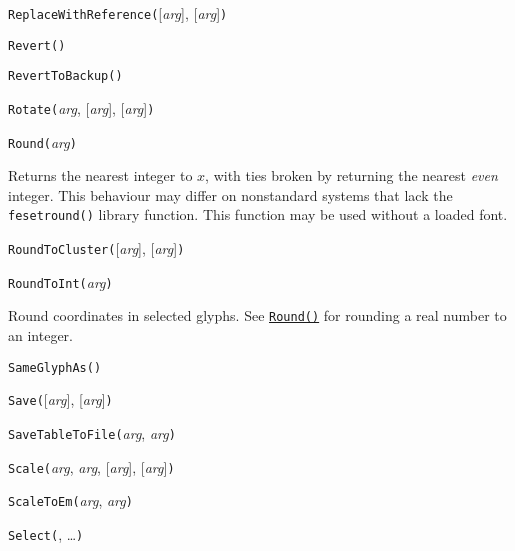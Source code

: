 
\noindent\texttt{ReplaceWithReference(}[\textit{arg}], [\textit{arg}]\texttt{)}


\noindent\texttt{Revert(}\texttt{)}


\noindent\texttt{RevertToBackup(}\texttt{)}


\noindent\texttt{Rotate(}\textit{arg}, [\textit{arg}], [\textit{arg}]\texttt{)}


\noindent\texttt{Round(}\textit{arg}\texttt{)}

Returns the nearest integer to $x$, with ties broken by returning the
nearest \emph{even} integer.  This behaviour may differ on nonstandard
systems that lack the \texttt{fesetround()} library function.
This function may be used without a loaded font.


\noindent\texttt{RoundToCluster(}[\textit{arg}], [\textit{arg}]\texttt{)}


\noindent\texttt{RoundToInt(}\textit{arg}\texttt{)}

Round coordinates in selected glyphs.  See
\hyperref[func:Round]{\texttt{Round()}} for rounding a
real number to an integer.


\noindent\texttt{SameGlyphAs(}\texttt{)}


\noindent\texttt{Save(}[\textit{arg}], [\textit{arg}]\texttt{)}


\noindent\texttt{SaveTableToFile(}\textit{arg}, \textit{arg}\texttt{)}


\noindent\texttt{Scale(}\textit{arg}, \textit{arg}, [\textit{arg}], [\textit{arg}]\texttt{)}


\noindent\texttt{ScaleToEm(}\textit{arg}, \textit{arg}\texttt{)}


\noindent\texttt{Select(}, \ldots\texttt{)}


